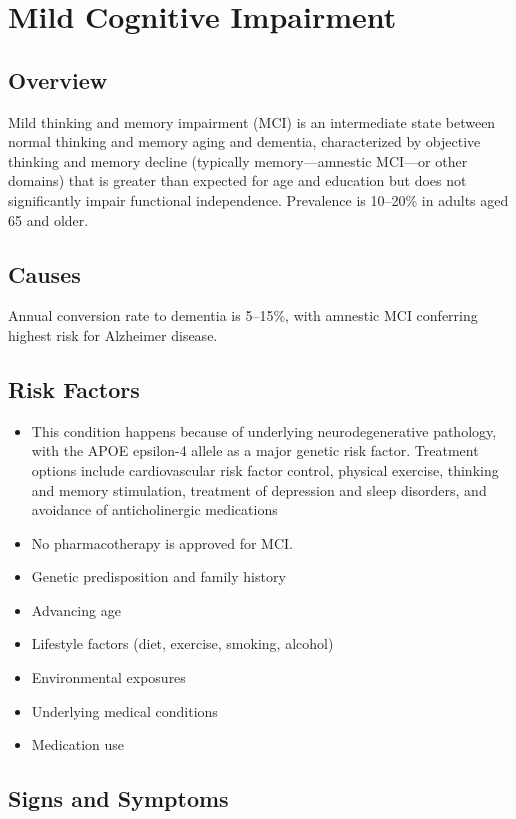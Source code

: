 \chapter{Mild Cognitive Impairment}
\label{sec:Mild Cognitive Impairment}

\section{Overview}
Mild thinking and memory impairment (MCI) is an intermediate state between normal thinking and memory aging and dementia, characterized by objective thinking and memory decline (typically memory---amnestic MCI---or other domains) that is greater than expected for age and education but does not significantly impair functional independence. Prevalence is 10--20\% in adults aged 65 and older.
\section{Causes}
Annual conversion rate to dementia is 5--15\%, with amnestic MCI conferring highest risk for Alzheimer disease.     
\section{Risk Factors}
\begin{itemize}[noitemsep]
  \item This condition happens because of underlying neurodegenerative pathology, with the APOE epsilon-4 allele as a major genetic risk factor. Treatment options include cardiovascular risk factor control, physical exercise, thinking and memory stimulation, treatment of depression and sleep disorders, and avoidance of anticholinergic medications
  \item No pharmacotherapy is approved for MCI.
  \item Genetic predisposition and family history
  \item Advancing age
  \item Lifestyle factors (diet, exercise, smoking, alcohol)
  \item Environmental exposures
  \item Underlying medical conditions
  \item Medication use
\end{itemize}
\section{Signs and Symptoms}
